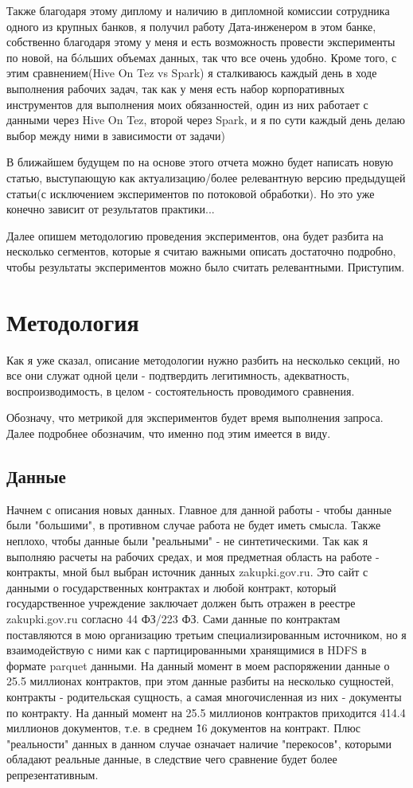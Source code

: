 \documentclass[12pt,letterpaper, onecolumn]{exam}
\begin{document}
Также благодаря этому диплому и наличию в дипломной комиссии сотрудника одного из крупных банков, я получил работу Дата-инженером в этом банке, собственно благодаря этому у меня и есть возможность провести эксперименты по новой, на б\'oльших объемах данных, так что все очень удобно. Кроме того, с этим сравнением(Hive On Tez vs Spark) я сталкиваюсь каждый день в ходе выполнения рабочих задач, так как у меня есть набор корпоративных инструментов для выполнения моих обязанностей, один из них работает с данными через Hive On Tez, второй через Spark, и я по сути каждый день делаю выбор между ними в зависимости от задачи)

В ближайшем будущем по на основе этого отчета можно будет написать новую статью, выступающую как актуализацию/более релевантную версию предыдущей статьи(с исключением экспериментов по потоковой обработки). Но это уже конечно зависит от результатов практики...

Далее опишем методологию проведения экспериментов, она будет разбита на несколько сегментов, которые я считаю важными описать достаточно подробно, чтобы результаты экспериментов можно было считать релевантными. Приступим.

\section{Методология}

Как я уже сказал, описание методологии нужно разбить на несколько секций, но все они служат одной цели - подтвердить легитимность, адекватность, воспроизводимость, в целом - состоятельность проводимого сравнения.

Обозначу, что метрикой для экспериментов будет время выполнения запроса. Далее подробнее обозначим, что именно под этим имеется в виду.

\subsection{Данные}

Начнем с описания новых данных. Главное для данной работы - чтобы данные были "большими", в противном случае работа не будет иметь смысла. Также неплохо, чтобы данные были "реальными" - не синтетическими. Так как я выполняю расчеты на рабочих средах, и моя предметная область на работе - контракты, мной был выбран источник данных zakupki.gov.ru. Это сайт с данными о государственных контрактах и любой контракт, который государственное учреждение заключает должен быть отражен в реестре zakupki.gov.ru согласно 44 ФЗ/223 ФЗ. Сами данные по контрактам поставляются в мою организацию третьим специализированным источником, но я взаимодействую с ними как с партицированными хранящимися в HDFS в формате parquet данными.
На данный момент в моем распоряжении данные о 25.5 миллионах контрактов, при этом данные разбиты на несколько сущностей, контракты - родительская сущность, а самая многочисленная из них - документы по контракту. На данный момент на 25.5 миллионов контрактов приходится 414.4 миллионов документов, т.е. в среднем \~16 документов на контракт. Плюс "реальности" данных в данном случае означает наличие "перекосов", которыми обладают реальные данные, в следствие чего сравнение будет более репрезентативным.
\end{document}
